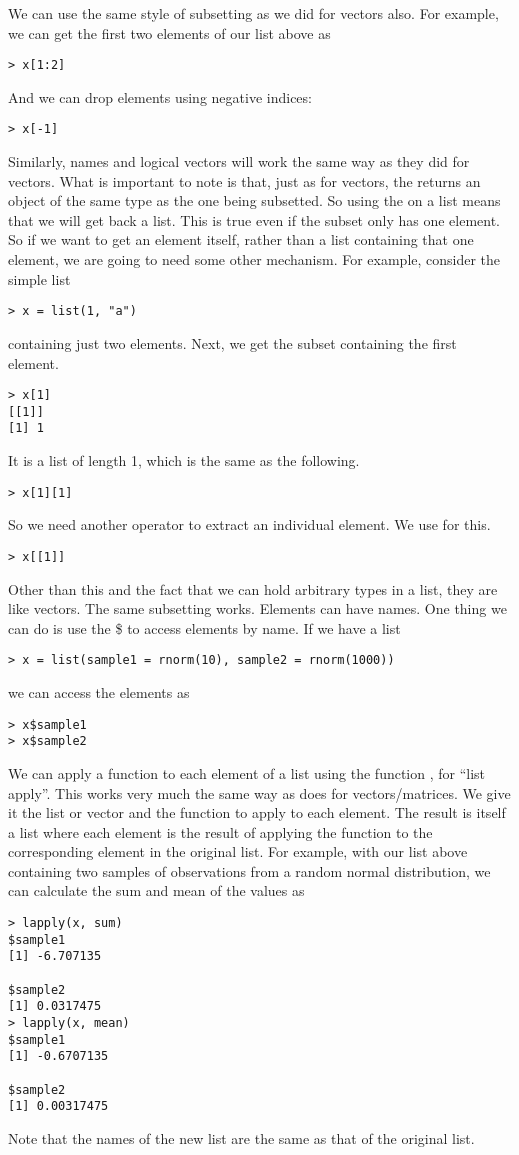 We can use the same style of subsetting as we did for vectors
also. For example, we can get the first two elements of our list above
as
\begin{verbatim}
> x[1:2]
\end{verbatim}
And we can drop elements using negative indices:
\begin{verbatim}
> x[-1]
\end{verbatim}
Similarly, names and logical vectors will work the same way as they
did for vectors. What is important to note is that, just as for
vectors, the \SOperator{[} returns an object of the same type as the
one being subsetted. So using the \SOperator{[} on a list means that
we will get back a list. This is true even if the subset only has one
element. So if we want to get an element itself, rather than a list
containing that one element, we are going to need some other
mechanism. For example, consider the simple list
\begin{verbatim}
> x = list(1, "a")
\end{verbatim}
containing just two elements.  Next, we get the subset containing the
first element.
\begin{verbatim}
> x[1]
[[1]]
[1] 1
\end{verbatim}
It is a list of length 1, which is the same as the following.
\begin{verbatim}
> x[1][1]
\end{verbatim}


So we need another operator to extract an individual element. We use
\SOperator{[[} for this.
\begin{verbatim}
> x[[1]]
\end{verbatim}
Other than this and the fact that we can hold arbitrary types in a
list, they are like vectors. The same subsetting works. Elements can
have names. One thing we can do is use the \$ to access
elements by name. If we have a list
\begin{verbatim}
> x = list(sample1 = rnorm(10), sample2 = rnorm(1000))
\end{verbatim}
we can access the elements as
\begin{verbatim}
> x$sample1
> x$sample2
\end{verbatim}
We can apply a function to each element of a list using the function
, for ``list apply''. This works very much the same
way as  does for vectors/matrices. We give it the
list or vector and the function to apply to each element. The result
is itself a list where each element is the result of applying the
function to the corresponding element in the original list. For
example, with our list above containing two samples of observations
from a random normal distribution, we can calculate the sum and mean
of the values as
\begin{verbatim}
> lapply(x, sum)
$sample1
[1] -6.707135

$sample2
[1] 0.0317475
> lapply(x, mean)
$sample1
[1] -0.6707135

$sample2
[1] 0.00317475
\end{verbatim}
Note that the names of the new list are the same as that of the original list. 

